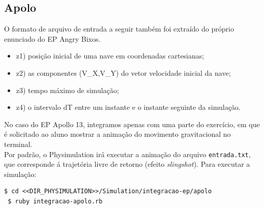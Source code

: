 \subsection{Apolo}

O formato de arquivo de entrada a seguir também foi extraído do próprio enunciado do EP Angry Bixos.

\begin{itemize}
  \item z1) posição inicial de uma nave em coordenadas cartesianas;                    
  \item z2) as componentes (V\_X,V\_Y) do vetor velocidade inicial da nave;
  \item z3) tempo máximo de simulação;               
  \item z4) o intervalo dT entre um instante e o instante seguinte da simulação.
\end{itemize}

No caso do EP Apollo 13, integramos apenas com uma parte do exercício, em que é solicitado ao aluno mostrar a animação do movimento gravitacional no terminal. \\

Por padrão, o Physimulation irá executar a animação do arquivo {\tt\small entrada.txt}, que corresponde á trajetória livre de retorno (efeito \textit{slingshot}). Para executar a simulação: 

\begin{Verbatim}[fontsize=\footnotesize]
 $ cd <<DIR_PHYSIMULATION>>/Simulation/integracao-ep/apolo
 $ ruby integracao-apolo.rb 
\end{Verbatim}

